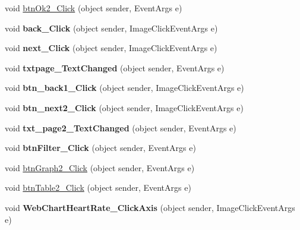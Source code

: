 \begin{DoxyCompactItemize}
\item 
void \hyperlink{classusertrackmyhealth__heartrate_ab22c95bf1d86797ac3a3304698ee0e1e}{btn\-Ok2\-\_\-\-Click} (object sender, Event\-Args e)
\item 
\hypertarget{classusertrackmyhealth__heartrate_ab355820878dccb22ebd4707a18284872}{void {\bfseries back\-\_\-\-Click} (object sender, Image\-Click\-Event\-Args e)}\label{classusertrackmyhealth__heartrate_ab355820878dccb22ebd4707a18284872}

\item 
\hypertarget{classusertrackmyhealth__heartrate_a79ebebe314a6104901905b12998bd4e6}{void {\bfseries next\-\_\-\-Click} (object sender, Image\-Click\-Event\-Args e)}\label{classusertrackmyhealth__heartrate_a79ebebe314a6104901905b12998bd4e6}

\item 
\hypertarget{classusertrackmyhealth__heartrate_a557a6a0a0482b6cd8de578fa4aa002e7}{void {\bfseries txtpage\-\_\-\-Text\-Changed} (object sender, Event\-Args e)}\label{classusertrackmyhealth__heartrate_a557a6a0a0482b6cd8de578fa4aa002e7}

\item 
\hypertarget{classusertrackmyhealth__heartrate_a73271e09cbb8ed18011b4d673d6dadcf}{void {\bfseries btn\-\_\-back1\-\_\-\-Click} (object sender, Image\-Click\-Event\-Args e)}\label{classusertrackmyhealth__heartrate_a73271e09cbb8ed18011b4d673d6dadcf}

\item 
\hypertarget{classusertrackmyhealth__heartrate_a2a74338d75f3356a02c6ce0139e33cd4}{void {\bfseries btn\-\_\-next2\-\_\-\-Click} (object sender, Image\-Click\-Event\-Args e)}\label{classusertrackmyhealth__heartrate_a2a74338d75f3356a02c6ce0139e33cd4}

\item 
\hypertarget{classusertrackmyhealth__heartrate_a0638553b83fd67cfb70f19f1797db2ab}{void {\bfseries txt\-\_\-page2\-\_\-\-Text\-Changed} (object sender, Event\-Args e)}\label{classusertrackmyhealth__heartrate_a0638553b83fd67cfb70f19f1797db2ab}

\item 
\hypertarget{classusertrackmyhealth__heartrate_a730bfa1defe357dad9f5209ffd2e76cd}{void {\bfseries btn\-Filter\-\_\-\-Click} (object sender, Event\-Args e)}\label{classusertrackmyhealth__heartrate_a730bfa1defe357dad9f5209ffd2e76cd}

\item 
void \hyperlink{classusertrackmyhealth__heartrate_a676e33c5d45b29f1898b8e502ea01316}{btn\-Graph2\-\_\-\-Click} (object sender, Event\-Args e)
\item 
void \hyperlink{classusertrackmyhealth__heartrate_a01d93fc4ac1bd22f08c7631c7ec61b32}{btn\-Table2\-\_\-\-Click} (object sender, Event\-Args e)
\item 
\hypertarget{classusertrackmyhealth__heartrate_a7872e99b380672e0dd9ff09af1e7608d}{void {\bfseries Web\-Chart\-Heart\-Rate\-\_\-\-Click\-Axis} (object sender, Image\-Click\-Event\-Args e)}\label{classusertrackmyhealth__heartrate_a7872e99b380672e0dd9ff09af1e7608d}


\end{DoxyCompactItemize}
